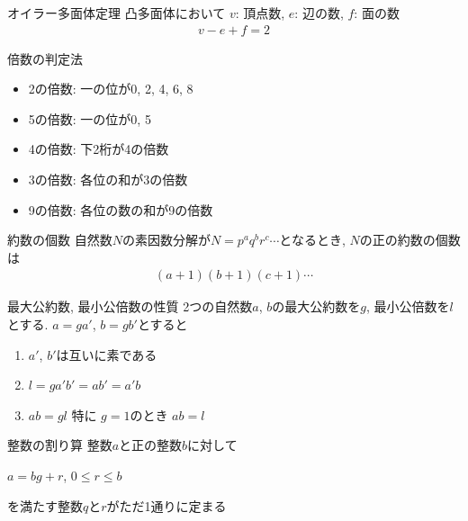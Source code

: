 \documentclass[aspectratio=169, 12pt]{beamer} %
\begin{document}
\begin{frame}{オイラー多面体定理}
    凸多面体において $v$: 頂点数, $e$: 辺の数, $f$: 面の数
    \begin{eqnarray*}
        v-e+f=2
    \end{eqnarray*}
\end{frame}
\begin{frame}{倍数の判定法}
    \begin{itemize}
        \item 2の倍数: 一の位が0, 2, 4, 6, 8
        \item 5の倍数: 一の位が0, 5
        \item 4の倍数: 下2桁が4の倍数
        \item 3の倍数: 各位の和が3の倍数
        \item 9の倍数: 各位の数の和が9の倍数
    \end{itemize}
\end{frame}
\begin{frame}{約数の個数}
    自然数$N$の素因数分解が$N=p^aq^br^c\cdots$となるとき, $N$の正の約数の個数は
    \begin{eqnarray*}
        (a+1)(b+1)(c+1)\cdots
    \end{eqnarray*}
\end{frame}
\begin{frame}{最大公約数, 最小公倍数の性質}
    2つの自然数$a$, $b$の最大公約数を$g$, 最小公倍数を$l$とする. $a=ga'$, $b=gb'$とすると
    \begin{enumerate}
        \item $a'$, $b'$は互いに素である
        \item $l=ga'b'=ab'=a'b$
        \item $ab=gl$ 特に $g=1$のとき $ab=l$
    \end{enumerate}
\end{frame}
\begin{frame}{整数の割り算}
    整数$a$と正の整数$b$に対して
    \begin{center}
        $a=bg+r$, $0 \leq r \leq b$
    \end{center}
    を満たす整数$q$と$r$がただ1通りに定まる
\end{frame}
\end{document}
